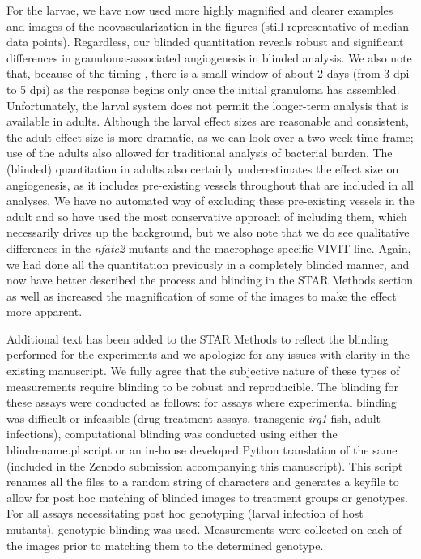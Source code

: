 \begin{description}[style=multiline, labelwidth=\widthof{Reviewer \#2:   }, font=\normalfont, leftmargin=\labelwidth, align=right]
\item \quad For the larvae, we have now used more highly magnified and clearer examples and images of the neovascularization in the figures (still representative of median data points). Regardless, our blinded quantitation reveals robust and significant differences in granuloma\hyp{}associated angiogenesis in blinded analysis. We also note that, because of the timing \citep{Oehlers2015, Walton2018}, there is a small window of about 2 days (from 3 dpi to 5 dpi) as the response begins only once the initial granuloma has assembled. Unfortunately, the larval system does not permit the longer\hyp{}term analysis that is available in adults. Although the larval effect sizes are reasonable and consistent, the adult effect size is more dramatic, as we can look over a two\hyp{}week time\hyp{}frame; use of the adults also allowed for traditional analysis of bacterial burden. The (blinded) quantitation in adults also certainly underestimates the effect size on angiogenesis, as it includes pre\hyp{}existing vessels throughout that are included in all analyses. We have no automated way of excluding these pre\hyp{}existing vessels in the adult and so have used the most conservative approach of including them, which necessarily drives up the background, but we also note that we do see qualitative differences in the \textit{nfatc2} mutants and the macrophage\hyp{}specific VIVIT line. Again, we had done all the quantitation previously in a completely blinded manner, and now have better described the process and blinding in the STAR Methods section as well as increased the magnification of some of the images to make the effect more apparent.

\item \quad Additional text has been added to the STAR Methods to reflect the blinding performed for the experiments and we apologize for any issues with clarity in the existing manuscript. We fully agree that the subjective nature of these types of measurements require blinding to be robust and reproducible. The blinding for these assays were conducted as follows: for assays where experimental blinding was difficult or infeasible (drug treatment assays, transgenic \textit{irg1} fish, adult infections), computational blinding was conducted using either the blindrename.pl script \citep{Salter2016} or an in\hyp{}house developed Python translation of the same (included in the Zenodo submission accompanying this manuscript). This script renames all the files to a random string of characters and generates a keyfile to allow for post hoc matching of blinded images to treatment groups or genotypes. For all assays necessitating post hoc genotyping (larval infection of host mutants), genotypic blinding was used. Measurements were collected on each of the images prior to matching them to the determined genotype. 


\end{description}

